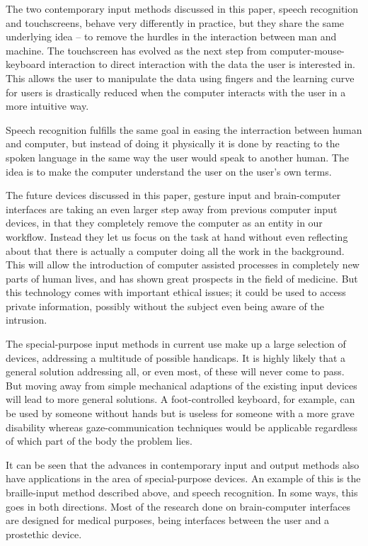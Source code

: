 
The two contemporary input methods discussed in this paper, speech recognition and touchscreens, behave very differently in practice, but they share the same underlying idea -- to remove the hurdles in the interaction between man and machine. The touchscreen has evolved as the next step from computer-mouse-keyboard interaction to direct interaction with the data the user is interested in. This allows the user to manipulate the data using fingers and the learning curve for users is drastically reduced when the computer interacts with the user in a more intuitive way.

Speech recognition fulfills the same goal in easing the interraction between human and computer, but instead of doing it physically it is done by reacting to the spoken language in the same way the user would speak to another human. The idea is to make the computer understand the user on the user's own terms.


The future devices discussed in this paper, gesture input and brain-computer interfaces are taking an even larger step away from previous computer input devices, in that they completely remove the computer as an entity in our workflow. Instead they let us focus on the task at hand without even reflecting about that there is actually a computer doing all the work in the background. This will allow the introduction of computer assisted processes in completely new parts of human lives, and has shown great prospects in the field of medicine. But this technology comes with important ethical issues; it could be used to access private information, possibly without the subject even being aware of the intrusion.

The special-purpose input methods in current use make up a large selection of devices, addressing a multitude of possible handicaps. It is highly likely that a general solution addressing all, or even most, of these will never come to pass. But moving away from simple mechanical adaptions of the existing input devices will lead to more general solutions. A foot-controlled keyboard, for example, can be used by someone without hands but is useless for someone with a more grave disability whereas gaze-communication techniques would be applicable regardless of which part of the body the problem lies.

It can be seen that the advances in contemporary input and output methods also have applications in the area of special-purpose devices. An example of this is the braille-input method described above, and speech recognition. In some ways, this goes in both directions. Most of the research done on brain-computer interfaces are designed for medical purposes, being interfaces between the user and a prostethic device.

